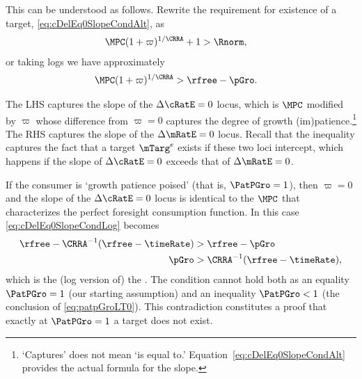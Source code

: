 \documentclass{\handout}
\begin{document}
This can be understood as follows.  Rewrite the requirement for existence of a target, \eqref{eq:cDelEq0SlopeCondAlt}, as 
\begin{equation}\begin{gathered}\begin{aligned}
  \MPCU (1+\varpi)^{1/\CRRA}+1 & >   \Rnorm  \label{eq:cDelEq0SlopeCondAltAlt}
,\end{aligned}\end{gathered}\end{equation}
or taking logs we have approximately 
\begin{equation}\begin{gathered}\begin{aligned}
  \MPCU (1+\varpi)^{1/\CRRA} & >   \rfree-\pGro \label{eq:cDelEq0SlopeCondLog}
.\end{aligned}\end{gathered}\end{equation}

The LHS captures the slope of the $\dcEqZero$ locus, which is $\MPCU$ modified by $\varpi$ whose difference from $\varpi=0$ captures the degree of growth (im)patience.\footnote{`Captures' does not mean `is equal to.'  Equation~\eqref{eq:cDelEq0SlopeCondAlt} provides the actual formula for the slope.}  The RHS captures the slope of the $\dmEqZero$ locus.  Recall that the inequality captures the fact that a target $\mTarg^{e}$ exists if these two loci intercept, which happens if the slope of $\dcEqZero$ exceeds that of $\dmEqZero$.

If the consumer is `growth patience poised' (that is, $\PatPGro = 1$), then $\varpi = 0$ and the slope of the $\dcEqZero$ locus is identical to the $\MPCU$ that characterizes the perfect foresight consumption function.  In this case \eqref{eq:cDelEq0SlopeCondLog} becomes
\begin{equation}\begin{gathered}\begin{aligned}
  \rfree-\CRRA^{-1}(\rfree-\timeRate) & >   \rfree-\pGro
\\ \pGro & >  \CRRA^{-1}(\rfree-\timeRate) \label{eq:patpGroLT0}
,\end{aligned}\end{gathered}\end{equation}
which is the (log version of) the \GICPGro.  The condition cannot hold both as an equality $\PatPGro=1$ (our starting assumption) and an inequality $\PatPGro < 1$ (the conclusion of \eqref{eq:patpGroLT0}).  This contradiction constitutes a proof that exactly at $\PatPGro=1$ a target does not exist.
\end{document}
